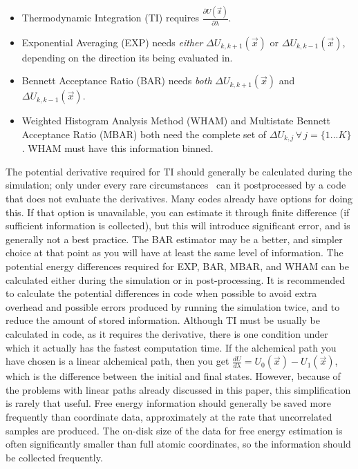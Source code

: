 \documentclass[9pt,bestpractices]{livecoms}
\begin{document}
%
\begin{itemize}
    \item Thermodynamic Integration (TI) requires $\frac{\partial U(\vec{x})}{\partial\lambda}$.
    \item Exponential Averaging (EXP) needs \textit{either} $\Delta U_{k,k+1}(\vec{x})$ or $\Delta U_{k,k-1}(\vec{x})$, depending on the direction its being evaluated in.
    \item Bennett Acceptance Ratio (BAR) needs \textit{both} $\Delta U_{k,k+1}(\vec{x})$ and $\Delta U_{k,k-1}(\vec{x})$.
    \item Weighted Histogram Analysis Method (WHAM) and Multistate Bennett Acceptance Ratio (MBAR) both need the complete set of $\Delta U_{k,j} \, \forall \, j=\{1...K\}$. WHAM must have this information binned.
\end{itemize}
%
The potential derivative required for TI should generally be calculated during the simulation; only under every rare circumstances~\cite{naden2015linear} can it postprocessed by a code that does not evaluate the derivatives. Many codes already have options for doing this.
If that option is unavailable, you can estimate it through finite difference (if sufficient information is collected), but this  will introduce significant error, and is generally not a best practice. The BAR estimator may be a better, and simpler choice at that point as you will have at least the same level of information. 
The potential energy differences required for EXP, BAR, MBAR, and WHAM can be calculated either during the simulation or in post-processing. It is recommended to calculate the potential differences in code when possible to avoid extra overhead and possible errors produced by running the simulation twice, and to reduce the amount of stored information. 
Although TI must be usually be calculated in code, as it requires the derivative, there is one condition under which it actually has the fastest computation time. 
If the alchemical path you have chosen is a linear alchemical path, then you get $\frac{dU}{d\lambda} = U_0(\vec{x}) - U_1(\vec{x})$, which is the difference between the initial and final states. 
However, because of the problems with linear paths already discussed in this paper, this simplification is rarely that useful.
%
Free energy information should generally be saved more frequently than coordinate data, approximately at the rate that uncorrelated samples are produced.  
The on-disk size of the data for free energy estimation is often significantly smaller than full atomic coordinates, so the information should be collected frequently. 
\end{document}
